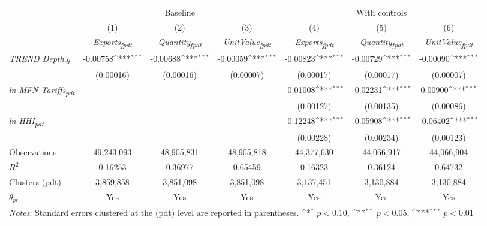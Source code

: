 {
\def\sym#1{\ifmmode^{#1}\else\(^{#1}\)\fi}
\begin{tabular}{l*{6}{c}}
\toprule
&\multicolumn{3}{c}{Baseline}&\multicolumn{3}{c}{With controls}\\\cmidrule(lr){2-4}\cmidrule(lr){5-7}
&(1)&(2)&(3)&(4)&(5)&(6)\\
&\textit{Exports\textsubscript{fpdt}}&\textit{Quantity\textsubscript{fpdt}}&\textit{UnitValue\textsubscript{fpdt}}&\textit{Exports\textsubscript{fpdt}}&\textit{Quantity\textsubscript{fpdt}}&\textit{UnitValue\textsubscript{fpdt}}\\
\midrule
\textit{TREND Depth\textsubscript{dt}} & -0.00758\sym{***} & -0.00688\sym{***} & -0.00059\sym{***} & -0.00823\sym{***} & -0.00729\sym{***} & -0.00090\sym{***}\\
 & (0.00016) & (0.00016) & (0.00007) & (0.00017) & (0.00017) & (0.00007)\\
\addlinespace
\textit{ln MFN Tariffs\textsubscript{pdt}} &  &  &  & -0.01008\sym{***} & -0.02231\sym{***} & 0.00900\sym{***}\\
 &  &  &  & (0.00127) & (0.00135) & (0.00086)\\
\addlinespace
\textit{ln HHI\textsubscript{pdt}} &  &  &  & -0.12248\sym{***} & -0.05908\sym{***} & -0.06402\sym{***}\\
 &  &  &  & (0.00228) & (0.00234) & (0.00123)\\
\midrule
Observations & 49,243,093 & 48,905,831 & 48,905,818 & 44,377,630 & 44,066,917 & 44,066,904\\
$R^{2}$ & 0.16253 & 0.36977 & 0.65459 & 0.16323 & 0.36124 & 0.64732\\
Clusters (pdt) & 3,859,858 & 3,851,098 & 3,851,098 & 3,137,451 & 3,130,884 & 3,130,884\\
$\theta_{pt}$ & Yes & Yes & Yes & Yes & Yes & Yes\\
\bottomrule
\multicolumn{7}{l}{\footnotesize \textit{Notes}: Standard errors clustered at the (pdt) level are reported in parentheses. \sym{*} \(p<0.10\), \sym{**} \(p<0.05\), \sym{***} \(p<0.01\)}\\
\end{tabular}
}
